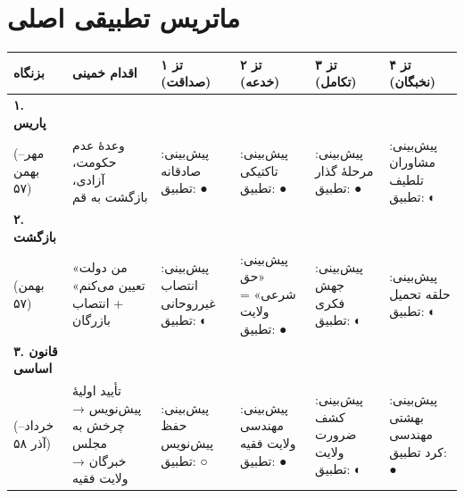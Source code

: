 \section{ماتریس تطبیقی اصلی}

\begin{landscape}

\begin{longtable}{%
    >{\raggedleft\arraybackslash}p{}
    >{\raggedleft\arraybackslash}p{}
    >{\raggedleft\arraybackslash}p{}
    >{\raggedleft\arraybackslash}p{}
    >{\raggedleft\arraybackslash}p{}
    >{\raggedleft\arraybackslash}p{}}
\toprule
\rowcolor{cPrimary!15}
\textbf{بزنگاه} &
\textbf{اقدام خمینی} &
\cellcolor{cGreen!15}\textbf{تز ۱ (صداقت)} &
\cellcolor{cAccent!10}\textbf{تز ۲ (خدعه)} &
\cellcolor{cGold!15}\textbf{تز ۳ (تکامل)} &
\cellcolor{cConsolid!10}\textbf{تز ۴ (نخبگان)} \\
\midrule
\endhead

\textbf{۱. پاریس}{\footnotesize\\ (مهر–بهمن ۵۷)} &
وعدهٔ عدم حکومت، آزادی، بازگشت به قم &
\cellcolor{cGreen!8} پیش‌بینی: صادقانه \newline تطبیق: ● &
\cellcolor{cAccent!5} پیش‌بینی: تاکتیکی \newline تطبیق: ● &
\cellcolor{cGold!8} پیش‌بینی: مرحلهٔ گذار \newline تطبیق: ● &
\cellcolor{cConsolid!5} پیش‌بینی: مشاوران تلطیف \newline تطبیق: ◐ \\
\midrule

\textbf{۲. بازگشت}{\footnotesize\\ (بهمن ۵۷)} &
«من دولت تعیین می‌کنم» + انتصاب بازرگان &
\cellcolor{cGreen!8} پیش‌بینی: انتصاب غیرروحانی \newline تطبیق: ◐ &
\cellcolor{cAccent!5} پیش‌بینی: «حق شرعی» = ولایت \newline تطبیق: ● &
\cellcolor{cGold!8} پیش‌بینی: جهش فکری \newline تطبیق: ◐ &
\cellcolor{cConsolid!5} پیش‌بینی: حلقه تحمیل \newline تطبیق: ◐ \\
\midrule

\textbf{۳. قانون اساسی}{\footnotesize\\ (خرداد–آذر ۵۸)} &
تأیید اولیهٔ پیش‌نویس → چرخش به مجلس خبرگان → ولایت فقیه &
\cellcolor{cGreen!8} پیش‌بینی: حفظ پیش‌نویس \newline تطبیق: ○ &
\cellcolor{cAccent!5} پیش‌بینی: مهندسی ولایت فقیه \newline تطبیق: ● &
\cellcolor{cGold!8} پیش‌بینی: کشف ضرورت ولایت \newline تطبیق: ◐ &
\cellcolor{cConsolid!5} پیش‌بینی: بهشتی مهندسی کرد \newline تطبیق: ● \\
\midrule


\end{longtable}
\end{landscape}
